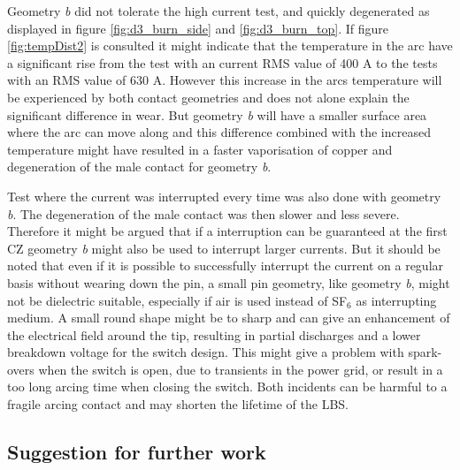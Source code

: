 \documentclass[10pt,a4paper]{article}
\begin{document}
Geometry \textit{b} did not tolerate the high current test, and quickly degenerated as displayed in figure \ref{fig:d3_burn_side} and \ref{fig:d3_burn_top}. If figure \ref{fig:tempDist2} is consulted it might indicate that the temperature in the arc have a significant rise from the test with an current RMS value of 400 A to the tests with an RMS value of 630 A. However this increase in the arcs temperature will be experienced by both contact geometries and does not alone explain the significant difference in wear. But geometry \textit{b} will have a smaller surface area where the arc can move along and this difference combined with the increased temperature might have resulted in a faster vaporisation of copper and degeneration of the male contact for geometry \textit{b}.

Test where the current was interrupted every time was also done with geometry \textit{b}. The degeneration of the male contact was then slower and less severe. Therefore it might be argued that if a interruption can be guaranteed at the first CZ geometry \textit{b} might also be used to interrupt larger currents. But it should be noted that even if it is possible to successfully interrupt the current on a regular basis without wearing down the pin, a small pin geometry, like geometry \textit{b}, might not be dielectric suitable, especially if air is used instead of SF$_6$ as interrupting medium. A small round shape might be to sharp and can give an enhancement of the electrical field around the tip, resulting in partial discharges and a lower breakdown voltage for the switch design. This might give a problem with spark-overs when the switch is open, due to transients in the power grid, or result in a too long arcing time when closing the switch. Both incidents can be harmful to a fragile arcing contact and may shorten the lifetime of the LBS.
\newpage
\subsection{Suggestion for further work}
\end{document}

